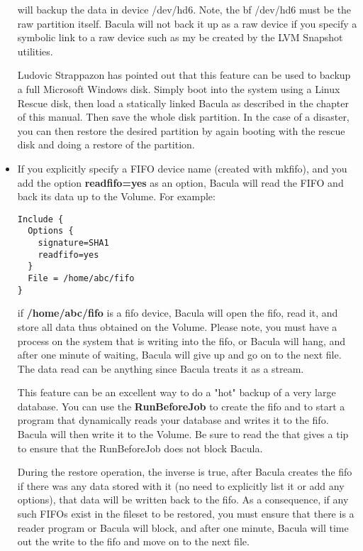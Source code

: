 \begin{itemize}
   will backup the data in device /dev/hd6. Note, the {bf /dev/hd6} must be
   the raw partition itself. Bacula will not back it up as a raw device if
   you specify a symbolic link to a raw device such as my be created by the
   LVM Snapshot utilities.

   Ludovic Strappazon has pointed out that this feature can be  used to backup a
   full Microsoft Windows disk. Simply boot into  the system using a Linux Rescue
   disk, then load a statically  linked Bacula as described in the 
    chapter of
   this manual. Then  save the whole disk partition. In the case of a disaster,
   you  can then restore the desired partition by again booting with  the rescue
   disk and doing a restore of the partition. 
   \item If you explicitly specify a FIFO device name (created with mkfifo),  and
   you add the option {\bf readfifo=yes} as an option, Bacula  will read the FIFO
   and back its data up to the Volume. For  example: 

\footnotesize
\begin{verbatim}
Include {
  Options {
    signature=SHA1
    readfifo=yes
  }
  File = /home/abc/fifo
}
\end{verbatim}
\normalsize

   if {\bf /home/abc/fifo} is a fifo device, Bacula will open the fifo,
   read it, and store all data thus obtained on the Volume.  Please note,
   you must have a process on the system that is writing into the fifo, or
   Bacula will hang, and after one minute of waiting, Bacula will give up
   and go on to the next file.  The data read can be anything since Bacula
   treats it as a stream.

   This feature can be an excellent way to do a "hot" backup of a very
   large database.  You can use the {\bf RunBeforeJob} to create the fifo
   and to start a program that dynamically reads your database and writes
   it to the fifo.  Bacula will then write it to the Volume.  Be sure to
   read the  that gives a
   tip to ensure that the RunBeforeJob does not block Bacula.

   During the restore operation, the inverse is true, after Bacula creates
   the fifo if there was any data stored with it (no need to explicitly
   list it or add any options), that data will be written back to the fifo.
   As a consequence, if any such FIFOs exist in the fileset to be restored,
   you must ensure that there is a reader program or Bacula will block, and
   after one minute, Bacula will time out the write to the fifo and move on
   to the next file.


\end{itemize}

